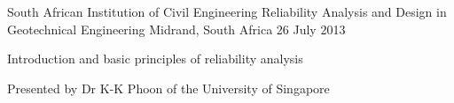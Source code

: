 \begin{cventries}

\cventry
{South African Institution of Civil Engineering} %
{Reliability Analysis and Design in Geotechnical Engineering} %
{Midrand, South Africa} %
{26 July 2013} %
{ %
\begin{cvitems}
\item {Introduction and basic principles of reliability analysis}
\item {Presented by Dr K-K Phoon of the University of Singapore}
\end{cvitems}
}


\end{cventries}